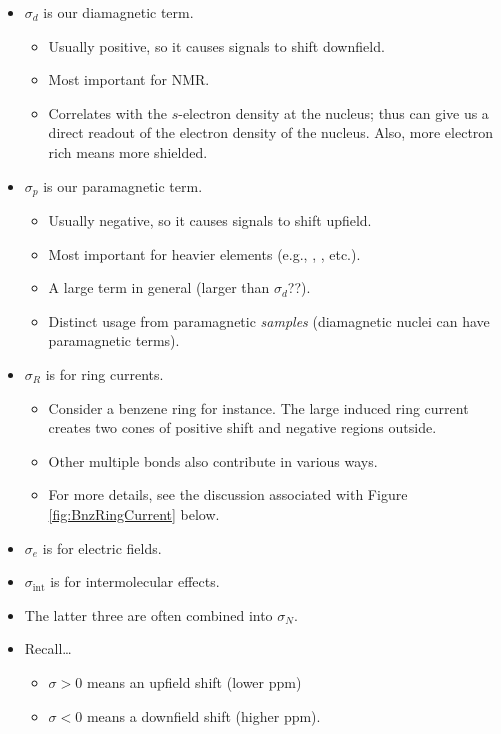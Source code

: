 \documentclass[../notes.tex]{subfiles}
\begin{document}
\begin{itemize}
\begin{itemize}
        \item $\sigma_d$ is our diamagnetic term.
        \begin{itemize}
            \item Usually positive, so it causes signals to shift downfield.
            \item Most important for  NMR.
            \item Correlates with the $s$-electron density at the nucleus; thus can give us a direct readout of the electron density of the nucleus. Also, more electron rich means more shielded.
        \end{itemize}
        \item $\sigma_p$ is our paramagnetic term.
        \begin{itemize}
            \item Usually negative, so it causes signals to shift upfield.
            \item Most important for heavier elements (e.g., , , etc.).
            \item A large term in general (larger than $\sigma_d$??).
            \item Distinct usage from paramagnetic \emph{samples} (diamagnetic nuclei can have paramagnetic terms).
        \end{itemize}
        \item $\sigma_R$ is for ring currents.
        \begin{itemize}
            \item Consider a benzene ring for instance. The large induced ring current creates two cones of positive shift and negative regions outside.
            \item Other multiple bonds also contribute in various ways.
            \item For more details, see the discussion associated with Figure \ref{fig:BnzRingCurrent} below.
        \end{itemize}
        \item $\sigma_e$ is for electric fields.
        \item $\sigma_\text{int}$ is for intermolecular effects.
        \item The latter three are often combined into $\sigma_N$.
        \item Recall\dots
        \begin{itemize}
            \item $\sigma>0$ means an upfield shift (lower ppm)
            \item $\sigma<0$ means a downfield shift (higher ppm).

\end{itemize}
\end{itemize}
\end{itemize}
\end{document}
